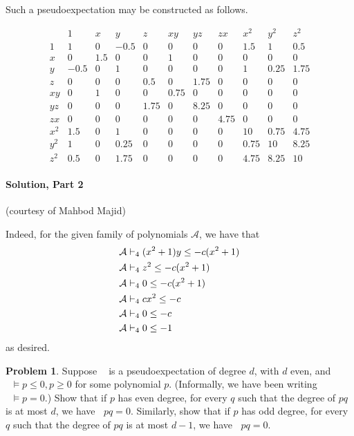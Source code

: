 \documentclass[11pt]{article}
\theoremstyle{definition}
\newtheorem{problem}[theorem]{Problem}
\DeclareMathOperator{\pE}{\widetilde{\mathbb{E}}} %
\begin{document}
  Such a pseudoexpectation may be constructed as follows.

  \[
  \begin{array}{c|cccccccccc}
   & 1 & x & y & z & xy & yz & zx & x^2 & y^2 & z^2 \\
  \hline
  1 & 1 & 0 & -0.5 & 0 & 0 & 0 & 0 & 1.5 & 1 & 0.5 \\
  x & 0 & 1.5 & 0 & 0 & 1 & 0 & 0 & 0 & 0 & 0 \\
  y & -0.5 & 0 & 1 & 0 & 0 & 0 & 0 & 1 & 0.25 & 1.75 \\
  z & 0 & 0 & 0 & 0.5 & 0 & 1.75 & 0 & 0 & 0 & 0 \\
  xy & 0 & 1 & 0 & 0 & 0.75 & 0 & 0 & 0 & 0 & 0 \\
  yz & 0 & 0 & 0 & 1.75 & 0 & 8.25 & 0 & 0 & 0 & 0 \\
  zx & 0 & 0 & 0 & 0 & 0 & 0 & 4.75 & 0 & 0 & 0 \\
  x^2 & 1.5 & 0 & 1 & 0 & 0 & 0 & 0 & 10 & 0.75 & 4.75 \\
  y^2 & 1 & 0 & 0.25 & 0 & 0 & 0 & 0 & 0.75 & 10 & 8.25 \\
  z^2 & 0.5 & 0 & 1.75 & 0 & 0 & 0 & 0 & 4.75 & 8.25 & 10
  \end{array}
  \]

\paragraph{Solution, Part 2} (courtesy of Mahbod Majid)

Indeed, for the given family of polynomials $\mathcal{A}$,
we have that 
\begin{align*}
\cal{A}
&\vdash_{4}
(x^2 + 1)y \le -c (x^2 + 1)  \\
\cal{A}
&\vdash_{4}
z^2 \le -c (x^2 + 1)  \\
\cal{A}
&\vdash_{4}
0 \le -c (x^2 + 1) \\
\cal{A}
&\vdash_{4}
cx^2 \le -c \\
\cal{A}
&\vdash_{4}
0 \le -c \\
\cal{A}
&\vdash_{4}
0 \le -1 
\end{align*}
as desired.


\newpage

\begin{problem}
  Suppose $\pE$ is a pseudoexpectation of degree $d$, with $d$ even, and $\pE \vDash p \leq 0, p \geq 0$ for some polynomial $p$. (Informally, we have been writing $\pE \vDash p = 0$.)
  Show that if $p$ has even degree, for every $q$ such that the degree of $pq$ is at most $d$, we have $\pE pq = 0$. Similarly, show that if $p$ has odd degree, for every $q$ such that the degree of $pq$ is at most $d-1$, we have $\pE pq = 0$.
\end{problem}
\end{document}
